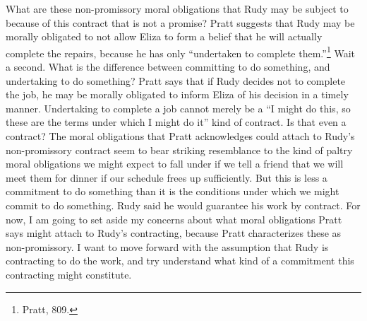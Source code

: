 What are these non-promissory moral obligations that Rudy may be subject
to because of this contract that is not a promise? Pratt suggests that
Rudy may be morally obligated to not allow Eliza to form a belief that
he will actually complete the repairs, because he has only ``undertaken
to complete them.''\footnote{Pratt, 809.} Wait a second. What is the
difference between committing to do something, and undertaking to do
something? Pratt says that if Rudy decides not to complete the job, he
may be morally obligated to inform Eliza of his decision in a timely
manner. Undertaking to complete a job cannot merely be a ``I might do
this, so these are the terms under which I might do it'' kind of
contract. Is that even a contract? The moral obligations that Pratt
acknowledges could attach to Rudy's non-promissory contract seem to bear
striking resemblance to the kind of paltry moral obligations we might
expect to fall under if we tell a friend that we will meet them for
dinner if our schedule frees up sufficiently. But this is less a
commitment to do something than it is the conditions under which we
might commit to do something. Rudy said he would guarantee his work by
contract. For now, I am going to set aside my concerns about what moral
obligations Pratt says might attach to Rudy's contracting, because Pratt
characterizes these as non-promissory. I want to move forward with the
assumption that Rudy is contracting to do the work, and try understand
what kind of a commitment this contracting might constitute.

